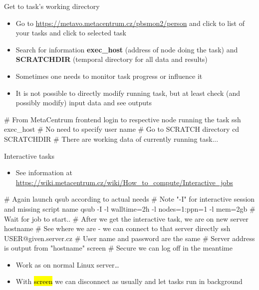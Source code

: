 \documentclass[compress, ucs, xelatex, 11pt, xcolor=svgnames,
  hyperref={
    bookmarks=true,
    unicode=true,
    colorlinks=true,
    pdftitle={Linux, command line and MetaCentrum},
    plainpages=false,
    pdfauthor={Vojtech Zeisek},
    pdfsubject={Course about use of Linux command line, writing shell scripts and using MetaCentrum of CESNET},
    pdfcreator={XeLaTeX},
    pdfkeywords={Linux, GNU, BASH, shell, command line, MetaCentrum},
    linkcolor=DarkRed,
    anchorcolor=DarkBlue,
    citecolor=Indigo,
    filecolor=NavyBlue,
    menucolor=DarkMagenta,
    urlcolor=DarkBlue,
    pdftex},
  url={hyphens, lowtilde} %
  ]{beamer}
\renewcommand{\texttt}[1]{\hl{\ttfamily #1}}
\begin{document}

\begin{frame}[fragile]{Get to task's working directory}
  \begin{itemize}
    \item Go to \url{https://metavo.metacentrum.cz/pbsmon2/person} and click to list of your tasks and click to selected task
    \item Search for information \textbf{exec\_host} (address of node doing the task) and \textbf{SCRATCHDIR} (temporal directory for all data and results)
    \item Sometimes one needs to monitor task progress or influence it
    \item It is not possible to directly modify running task, but at least check (and possibly modify) input data and see outputs
  \end{itemize}
  \begin{bashcode}
    # From MetaCentrum frontend login to respective node running the task
    ssh exec_host # No need to specify user name
    # Go to SCRATCH directory
    cd SCRATCHDIR
    # There are working data of currently running task...
  \end{bashcode}
\end{frame}

\begin{frame}[fragile]{Interactive tasks}
  \begin{itemize}
    \item See information at \url{https://wiki.metacentrum.cz/wiki/How_to_compute/Interactive_jobs}
  \end{itemize}
  \begin{bashcode}
    # Again launch qsub according to actual needs
    # Note "-I" for interactive session and missing script name
    qsub -I -l walltime=2h -l nodes=1:ppn=1 -l mem=2gb
    # Wait for job to start..
    # After we get the interactive task, we are on new server
    hostname # See where we are - we can connect to that server directly
    ssh USER@given.server.cz # User name and password are the same
                             # Server address is output from "hostname"
    screen # Secure we can log off in the meantime
  \end{bashcode}
  \begin{itemize}
    \item Work as on normal Linux server\ldots
    \item With \texttt{screen} we can disconnect as usually and let tasks run in background
  \end{itemize}
\end{frame}
\end{document}
